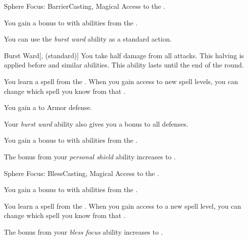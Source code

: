     \begin{feat}{Sphere Focus: Barrier}{Casting, Magical}
        \featpre Access to the  .

         You gain a  bonus to  with abilities from the  .

         You can use the \textit{burst ward} ability as a standard action.
        \begin{freeability}{Burst Ward}[,  (standard)]
            You take half damage from all attacks.
            This halving is applied before  and similar abilities.
            This ability lasts until the end of the round.
        \end{freeability}

         You learn a spell from the  .
        When you gain access to new spell levels, you can change which spell you know from that .

         You gain a   to Armor defense.

         Your \textit{burst ward} ability also gives you a  bonus to all defenses.

         You gain a  bonus to  with abilities from the  .

         The bonus from your \textit{personal shield} ability increases to .
    \end{feat}

    \begin{feat}{Sphere Focus: Bless}{Casting, Magical}
        \featpre Access to the  .

         You gain a  bonus to  with abilities from the  .

         You learn a spell from the  .
        When you gain access to a new spell level, you can change which spell you know from that .

         The bonus from your \textit{bless focus} ability increases to .
    \end{feat}

